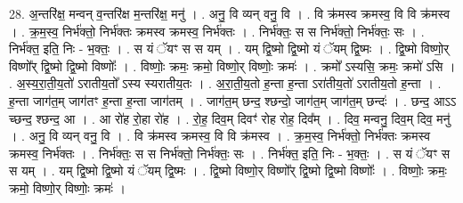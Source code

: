 \documentclass[17pt]{extarticle}
\begin{document}
28. अ॒न्तरि॑क्ष॒ मन्वन् व॒न्तरि॑क्ष म॒न्तरि॑क्ष॒ मनु॑ । . अनु॒ वि व्यन् वनु॒ वि । . वि क्र॑मस्व क्रमस्व॒ वि वि क्र॑मस्व । . क्र॒म॒स्व॒ निर्भ॑क्तो॒ निर्भ॑क्तः क्रमस्व क्रमस्व॒ निर्भ॑क्तः । . निर्भ॑क्तः॒ स स निर्भ॑क्तो॒ निर्भ॑क्तः॒ सः । . निर्भ॑क्त॒ इति॒ निः - भ॒क्तः॒ । . स यं ॅयꣳ स स यम् । . यम् द्वि॒ष्मो द्वि॒ष्मो यं ॅयम् द्वि॒ष्मः । . द्वि॒ष्मो विष्णो॒र् विष्णो᳚र् द्वि॒ष्मो द्वि॒ष्मो विष्णोः᳚ । . विष्णोः॒ क्रमः॒ क्रमो॒ विष्णो॒र् विष्णोः॒ क्रमः॑ । . क्रमो᳚ ऽस्यसि॒ क्रमः॒ क्रमो॑ ऽसि । . अ॒स्य॒रा॒ती॒य॒तो॑ ऽरातीय॒तो᳚ ऽस्य स्यरातीय॒तः । . अ॒रा॒ती॒य॒तो ह॒न्ता ह॒न्ता ऽरा॑तीय॒तो॑ ऽरातीय॒तो ह॒न्ता । . ह॒न्ता जाग॑त॒म् जाग॑तꣳ ह॒न्ता ह॒न्ता जाग॑तम् । . जाग॑त॒म् छन्द॒ श्छन्दो॒ जाग॑त॒म् जाग॑त॒म् छन्दः॑ । . छन्द॒ आऽऽ च्छन्द॒ श्छन्द॒ आ । . आ रो॑ह रो॒हा रो॑ह । . रो॒ह॒ दिव॒म् दिवꣳ॑ रोह रोह॒ दिव᳚म् । . दिव॒ मन्वनु॒ दिव॒म् दिव॒ मनु॑ । . अनु॒ वि व्यन् वनु॒ वि । . वि क्र॑मस्व क्रमस्व॒ वि वि क्र॑मस्व । . क्र॒म॒स्व॒ निर्भ॑क्तो॒ निर्भ॑क्तः क्रमस्व क्रमस्व॒ निर्भ॑क्तः । . निर्भ॑क्तः॒ स स निर्भ॑क्तो॒ निर्भ॑क्तः॒ सः । . निर्भ॑क्त॒ इति॒ निः - भ॒क्तः॒ । . स यं ॅयꣳ स स यम् । . यम् द्वि॒ष्मो द्वि॒ष्मो यं ॅयम् द्वि॒ष्मः । . द्वि॒ष्मो विष्णो॒र् विष्णो᳚र् द्वि॒ष्मो द्वि॒ष्मो विष्णोः᳚ । . विष्णोः॒ क्रमः॒ क्रमो॒ विष्णो॒र् विष्णोः॒ क्रमः॑ । \newline
\end{document}
